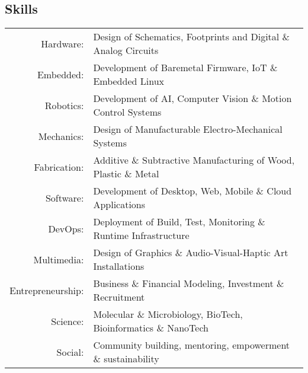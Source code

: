 \subsection{Skills}
\begin{tabular}
		{r p{10cm}}
		Hardware:& Design of Schematics, Footprints and Digital \& Analog Circuits\\
		Embedded:& Development of Baremetal Firmware, IoT \& Embedded Linux\\
		Robotics:& Development of AI, Computer Vision \& Motion Control Systems\\
		Mechanics:& Design of Manufacturable Electro-Mechanical Systems\\
		Fabrication:& Additive \& Subtractive Manufacturing of Wood, Plastic \& Metal\\
		Software:& Development of Desktop, Web, Mobile \& Cloud Applications\\
		DevOps:& Deployment of Build, Test, Monitoring \& Runtime Infrastructure\\
		Multimedia:& Design of Graphics \& Audio-Visual-Haptic Art Installations\\
		Entrepreneurship:& Business \& Financial Modeling, Investment \& Recruitment\\
		Science:& Molecular \& Microbiology, BioTech, Bioinformatics \& NanoTech\\
		Social:& Community building, mentoring, empowerment \& sustainability\\
\end{tabular}
